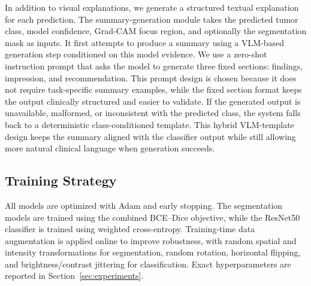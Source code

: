 In addition to visual explanations, we generate a structured textual explanation for each prediction. The summary-generation module takes the predicted tumor class, model confidence, Grad-CAM focus region, and optionally the segmentation mask as inputs. It first attempts to produce a summary using a VLM-based generation step conditioned on this model evidence. We use a zero-shot instruction prompt that asks the model to generate three fixed sections: findings, impression, and recommendation. This prompt design is chosen because it does not require task-specific summary examples, while the fixed section format keeps the output clinically structured and easier to validate. If the generated output is unavailable, malformed, or inconsistent with the predicted class, the system falls back to a deterministic class-conditioned template. This hybrid VLM-template design keeps the summary aligned with the classifier output while still allowing more natural clinical language when generation succeeds.

\subsection{Training Strategy}
All models are optimized with Adam and early stopping. The segmentation models are trained using the combined BCE--Dice objective, while the ResNet50 classifier is trained using weighted cross-entropy. Training-time data augmentation is applied online to improve robustness, with random spatial and intensity transformations for segmentation, random rotation, horizontal flipping, and brightness/contrast jittering for classification. Exact hyperparameters are reported in Section~\ref{sec:experiments}.